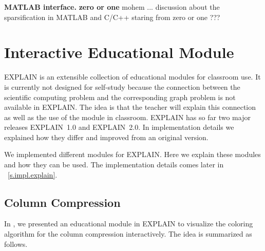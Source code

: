 \documentclass[12pt, oneside]{book}
\newcommand{\todo}[1]{\textbf{#1}}
\begin{document}
\textbf{MATLAB interface.}
\todo{zero or one}
mohem ... discussion about the sparsification in MATLAB and C/C++
staring from zero or one ???

\chapter{Interactive Educational Module}
\label{explain}
\mbox{EXPLAIN} is an extensible collection of educational modules for classroom use.
It is currently not designed for self-study because the connection between the scientific computing problem and the corresponding graph problem is not available in \mbox{EXPLAIN}. The idea is that the teacher will explain this connection as well as the use of the module in classroom.
EXPLAIN has so far two major releases \mbox{EXPLAIN 1.0} and \mbox{EXPLAIN 2.0}.
In implementation details we explained how they differ and improved from an original version.

We implemented different modules for EXPLAIN. 
Here we explain these modules and how they can be used.
The implementation details comes later in ~\ref{s.impl.explain}.
\section{Column Compression}
\label{s.column-compression}
In \cite{2013:05,2014:01}, we presented an educational module in \mbox{EXPLAIN} to visualize the
coloring algorithm for the column compression interactively. The idea is 
summarized as follows.
\end{document}
